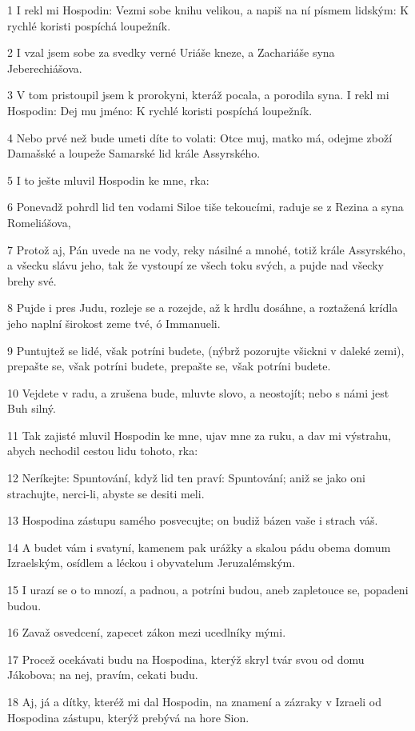 \par 1 I rekl mi Hospodin: Vezmi sobe knihu velikou, a napiš na ní písmem lidským: K rychlé koristi pospíchá loupežník.
\par 2 I vzal jsem sobe za svedky verné Uriáše kneze, a Zachariáše syna Jeberechiášova.
\par 3 V tom pristoupil jsem k prorokyni, kteráž pocala, a porodila syna. I rekl mi Hospodin: Dej mu jméno: K rychlé koristi pospíchá loupežník.
\par 4 Nebo prvé než bude umeti díte to volati: Otce muj, matko má, odejme zboží Damašské a loupeže Samarské lid krále Assyrského.
\par 5 I to ješte mluvil Hospodin ke mne, rka:
\par 6 Ponevadž pohrdl lid ten vodami Siloe tiše tekoucími, raduje se z Rezina a syna Romeliášova,
\par 7 Protož aj, Pán uvede na ne vody, reky násilné a mnohé, totiž krále Assyrského, a všecku slávu jeho, tak že vystoupí ze všech toku svých, a pujde nad všecky brehy své.
\par 8 Pujde i pres Judu, rozleje se a rozejde, až k hrdlu dosáhne, a roztažená krídla jeho naplní širokost zeme tvé, ó Immanueli.
\par 9 Puntujtež se lidé, však potríni budete, (nýbrž pozorujte všickni v daleké zemi), prepašte se, však potríni budete, prepašte se, však potríni budete.
\par 10 Vejdete v radu, a zrušena bude, mluvte slovo, a neostojít; nebo s námi jest Buh silný.
\par 11 Tak zajisté mluvil Hospodin ke mne, ujav mne za ruku, a dav mi výstrahu, abych nechodil cestou lidu tohoto, rka:
\par 12 Neríkejte: Spuntování, když lid ten praví: Spuntování; aniž se jako oni strachujte, nerci-li, abyste se desiti meli.
\par 13 Hospodina zástupu samého posvecujte; on budiž bázen vaše i strach váš.
\par 14 A budet vám i svatyní, kamenem pak urážky a skalou pádu obema domum Izraelským, osídlem a léckou i obyvatelum Jeruzalémským.
\par 15 I urazí se o to mnozí, a padnou, a potríni budou, aneb zapletouce se, popadeni budou.
\par 16 Zavaž osvedcení, zapecet zákon mezi ucedlníky mými.
\par 17 Procež ocekávati budu na Hospodina, kterýž skryl tvár svou od domu Jákobova; na nej, pravím, cekati budu.
\par 18 Aj, já a dítky, kteréž mi dal Hospodin, na znamení a zázraky v Izraeli od Hospodina zástupu, kterýž prebývá na hore Sion.
